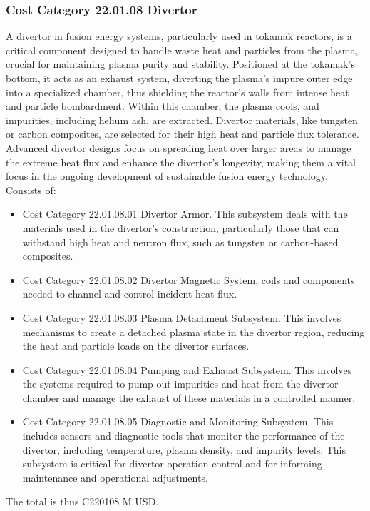 
\subsubsection*{Cost Category 22.01.08 Divertor}

A divertor in fusion energy systems, particularly used in tokamak reactors, is a critical component designed to handle waste heat and particles from the plasma, crucial for maintaining plasma purity and stability. Positioned at the tokamak's bottom, it acts as an exhaust system, diverting the plasma's impure outer edge into a specialized chamber, thus shielding the reactor's walls from intense heat and particle bombardment. Within this chamber, the plasma cools, and impurities, including helium ash, are extracted. Divertor materials, like tungsten or carbon composites, are selected for their high heat and particle flux tolerance. Advanced divertor designs focus on spreading heat over larger areas to manage the extreme heat flux and enhance the divertor's longevity, making them a vital focus in the ongoing development of sustainable fusion energy technology.\\

Consists of:

\begin{itemize}
    \item Cost Category 22.01.08.01 Divertor Armor. This subsystem deals with the materials used in the divertor's construction, particularly those that can withstand high heat and neutron flux, such as tungsten or carbon-based composites.

    \item Cost Category 22.01.08.02 Divertor Magnetic System, coils and components needed to channel and control incident heat flux.

    \item  Cost Category 22.01.08.03 Plasma Detachment Subsystem. This involves mechanisms to create a detached plasma state in the divertor region, reducing the heat and particle loads on the divertor surfaces.


    \item Cost Category 22.01.08.04 Pumping and Exhaust Subsystem. This involves the systems required to pump out impurities and heat from the divertor chamber and manage the exhaust of these materials in a controlled manner.

    \item Cost Category 22.01.08.05 Diagnostic and Monitoring Subsystem. This includes sensors and diagnostic tools that monitor the performance of the divertor, including temperature, plasma density, and impurity levels. This subsystem is critical for divertor operation control and for informing maintenance and operational adjustments.
\end{itemize}

The total is thus C220108 M USD.
